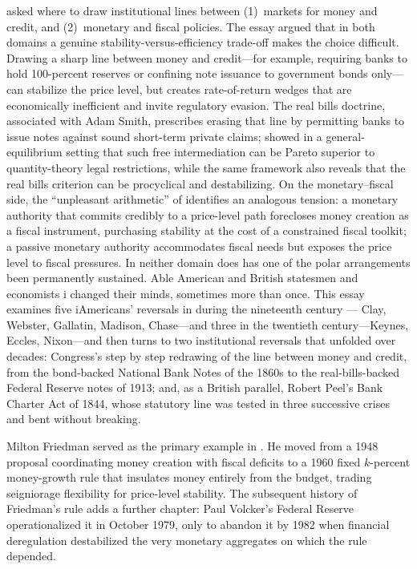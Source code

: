 \documentclass[12pt]{article}
\begin{document}
\citet{Sargent2011} asked where to draw institutional lines between
(1)~markets for money and credit, and (2)~monetary and fiscal policies.
The essay argued that in both domains a genuine stability-versus-efficiency
trade-off makes the choice difficult.  Drawing a sharp line between money
and credit---for example, requiring banks to hold 100-percent reserves or
confining note issuance to government bonds only---can stabilize the price
level, but creates rate-of-return wedges that are economically inefficient
and invite regulatory evasion.  The real bills doctrine, associated with
Adam Smith, prescribes erasing that line by permitting banks to issue notes
against sound short-term private claims; \citet{SargentWallace1982} showed
in a general-equilibrium setting that such free intermediation can be Pareto
superior to quantity-theory legal restrictions, while the same framework
also reveals that the real bills criterion can be procyclical and
destabilizing.  On the monetary--fiscal side, the ``unpleasant arithmetic''
of \citet{SargentWallace1981} identifies an analogous tension: a monetary
authority that commits credibly to a price-level path forecloses money
creation as a fiscal instrument, purchasing stability at the cost of a
constrained fiscal toolkit; a passive monetary authority accommodates
fiscal needs but exposes the price level to fiscal pressures.  In neither
domain does has one of the polar arrangements been permanently sustained.  Able American and British  statesmen
and economists i changed their minds,
sometimes more than once.  This essay examines five
iAmericans'  reversals in during the nineteenth century --- Clay, Webster,
Gallatin, Madison, Chase---and three in the twentieth century---Keynes, Eccles, Nixon---and then turns to two
institutional reversals that unfolded over decades: Congress's step by step
redrawing of the line between money and credit, from the bond-backed
National Bank Notes of the 1860s to the real-bills-backed Federal
Reserve notes of 1913; and, as a British parallel, Robert Peel's Bank
Charter Act of 1844, whose statutory line was tested in three successive
crises and bent without breaking.

Milton Friedman served as the primary example in \citet{Sargent2011}. He
moved from a 1948 proposal coordinating money creation with fiscal
deficits to a 1960 fixed $k$-percent money-growth rule that insulates money
entirely from the budget, trading seigniorage flexibility for price-level
stability.  The subsequent history of Friedman's
rule adds a further chapter: Paul Volcker's Federal Reserve
operationalized it in October 1979, only to abandon it by 1982 when
financial deregulation destabilized the very monetary aggregates on
which the rule depended.
\end{document}
